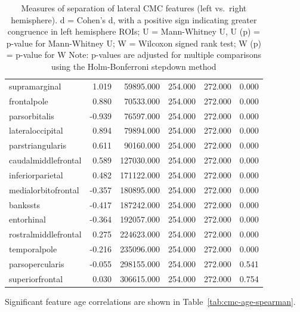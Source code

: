 \documentclass{article}
\begin{document}
\begin{table}
\begin{tabular}{lrrrrr}
	supramarginal            &  1.019 &  59895.000  & 254.000 & 272.000 & 0.000 \\
	frontalpole              &  0.880 &  70533.000  & 254.000 & 272.000 & 0.000 \\
	parsorbitalis            & -0.939 &  76597.000  & 254.000 & 272.000 & 0.000 \\
	lateraloccipital         &  0.894 &  79894.000  & 254.000 & 272.000 & 0.000 \\
	parstriangularis         &  0.611 &  90160.000  & 254.000 & 272.000 & 0.000 \\
	caudalmiddlefrontal      &  0.589 &  127030.000 & 254.000 & 272.000 & 0.000 \\
	inferiorparietal         &  0.482 &  171122.000 & 254.000 & 272.000 & 0.000 \\
	medialorbitofrontal      & -0.357 &  180895.000 & 254.000 & 272.000 & 0.000 \\
	bankssts                 & -0.417 &  187242.000 & 254.000 & 272.000 & 0.000 \\
	entorhinal               & -0.364 &  192057.000 & 254.000 & 272.000 & 0.000 \\
	rostralmiddlefrontal     &  0.275 &  224623.000 & 254.000 & 272.000 & 0.000 \\
	temporalpole             & -0.216 &  235096.000 & 254.000 & 272.000 & 0.000 \\
	parsopercularis          & -0.055 &  298155.000 & 254.000 & 272.000 & 0.541 \\
	superiorfrontal          &  0.030 &  306615.000 & 254.000 & 272.000 & 0.754 \\
	\bottomrule
\end{tabular}
\footnotesize
\caption{Measures of separation of lateral CMC features (left vs.\ right
hemisphere). d = Cohen's d, with a positive sign indicating greater congruence in left hemisphere ROIs;
U = Mann-Whitney U, U (p) = p-value for Mann-Whitney U;
W = Wilcoxon signed rank test; W (p) = p-value for W
Note: p-values are adjusted for multiple comparisons using the Holm-Bonferroni stepdown method
} \label{tab:lateral-cmc}
\normalsize
\end{table}


%

Significant feature age correlations are shown in Table~\ref{tab:cmc-age-spearman}.
\end{document}
